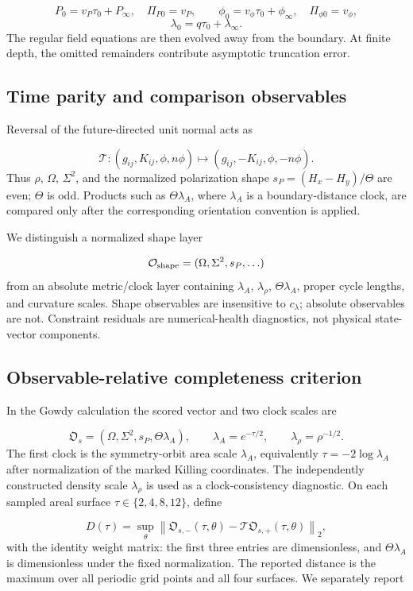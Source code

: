 \documentclass{iopjournal}
\begin{document}
\[
P_0=v_P\tau_0+P_\infty,
\quad \Pi_{P0}=v_P,
\qquad
\phi_0=v_\phi\tau_0+\phi_\infty,
\quad \Pi_{\phi0}=v_\phi,
\]
\[
\lambda_0=q\tau_0+\lambda_\infty.
\]
The regular field equations are then evolved away from the boundary. At finite depth, the omitted remainders contribute asymptotic truncation error.

\subsection{Time parity and comparison observables}
Reversal of the future-directed unit normal acts as

\[
\mathcal T:(g_{ij},K_{ij},\phi,n\phi)
\mapsto(g_{ij},-K_{ij},\phi,-n\phi).
\]
Thus $\rho$, $\Omega$, $\Sigma^2$, and the normalized polarization shape $s_P=(H_x-H_y)/\Theta$ are even; $\Theta$ is odd. Products such as $\Theta\lambda_A$, where $\lambda_A$ is a boundary-distance clock, are compared only after the corresponding orientation convention is applied.

We distinguish a normalized shape layer

\[
\mathcal O_{\rm shape}=(\Omega,\Sigma^2,s_P,\ldots)
\]
from an absolute metric/clock layer containing $\lambda_A$, $\lambda_\rho$, $\Theta\lambda_A$, proper cycle lengths, and curvature scales. Shape observables are insensitive to $c_\lambda$; absolute observables are not. Constraint residuals are numerical-health diagnostics, not physical state-vector components.

\subsection{Observable-relative completeness criterion}
In the Gowdy calculation the scored vector and two clock scales are

\[
\mathfrak O_s=(\Omega,\Sigma^2,s_P,\Theta\lambda_A),
\qquad \lambda_A=e^{-\tau/2},
\qquad \lambda_\rho=\rho^{-1/2}.
\]
The first clock is the symmetry-orbit area scale $\lambda_A$, equivalently $\tau=-2\log\lambda_A$ after normalization of the marked Killing coordinates. The independently constructed density scale $\lambda_\rho$ is used as a clock-consistency diagnostic. On each sampled areal surface $\tau\in\{2,4,8,12\}$, define

\[
D(\tau)=\sup_\theta
\left\|
\mathfrak O_{s,-}(\tau,\theta)
-\mathcal T\mathfrak O_{s,+}(\tau,\theta)
\right\|_2,
\]
with the identity weight matrix: the first three entries are dimensionless, and $\Theta\lambda_A$ is dimensionless under the fixed normalization. The reported distance is the maximum over all periodic grid points and all four surfaces. We separately report
\end{document}
